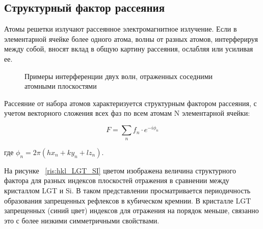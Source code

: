 \subsection{Структурный фактор рассеяния}
Атомы решетки излучают рассеянное электромагнитное излучение.
Если в элементарной ячейке более одного атома, волны от разных атомов,
 интерферируя между собой, вносят вклад в общую картину рассеяния,
 ослабляя или усиливая ее.

 \begin{figure}[h]
   \centering
   \hfill
   \caption{Примеры интерференции двух волн, отраженных соседними атомными плоскостями}
   \label{ris:interference_by_plate}
 \end{figure}

Рассеяние от набора атомов характеризуется структурным фактором рассеяния,
 с учетом векторного сложения всех фаз по всем атомам N элементарной ячейки:

 \begin{equation}
   F = \sum_{n} f_n \cdot e^{-i\phi_n}
  \end{equation}

  где $\phi_n = 2 \pi (hx_n+ky_n+lz_n)$.


На рисунке ~\ref{ris:hkl_LGT_SI} цветом изображена величина структурного фактора для разных
 индексов плоскостей отражения в сравнении между кристаллом LGT и Si.
 В таком представлении просматривается периодичность образования запрещенных
 рефлексов в кубическом кремнии. В кристалле LGT запрещенных (синий цвет)
  индексов для отражения на порядок меньше, связанно это с более низкими
  симметричными свойствами.

